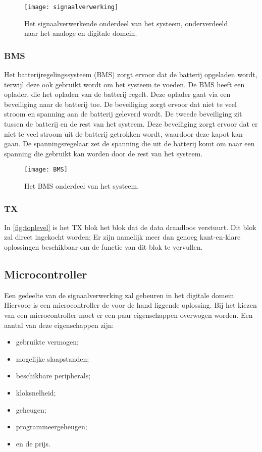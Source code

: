 \begin{figure}[ht]
    \centering
    \texttt{[image: signaalverwerking]}
    \caption{Het signaalverwerkende onderdeel van het systeem, onderverdeeld naar het analoge en digitale domein.}
    \label{fig:signaalverwerking}
\end{figure}

\subsubsection{BMS}
Het batterijregelingssysteem (BMS) zorgt ervoor dat de batterij opgeladen wordt, terwijl deze ook gebruikt wordt om het systeem te voeden.
De BMS heeft een oplader, die het opladen van de batterij regelt. Deze oplader gaat via een beveiliging naar de batterij toe. De beveiliging zorgt ervoor dat niet te veel stroom en spanning aan de batterij geleverd wordt. De tweede beveiliging zit tussen de batterij en de rest van het systeem. Deze beveiliging zorgt ervoor dat er niet te veel stroom uit de batterij getrokken wordt, waardoor deze kapot kan gaan. De spanningsregelaar zet de spanning die uit de batterij komt om naar een spanning die gebruikt kan worden door de rest van het systeem. 

\begin{figure}[ht]
    \centering
    \texttt{[image: BMS]}
    \caption{Het BMS onderdeel van het systeem.}
    \label{fig:BMS}
\end{figure}

\subsubsection{TX}
In \autoref{fig:toplevel} is het TX blok het blok dat de data draadloos verstuurt. Dit blok zal direct ingekocht worden; Er zijn namelijk meer dan genoeg kant-en-klare oplossingen beschikbaar om de functie van dit blok te vervullen.


\subsection{Microcontroller}
Een gedeelte van de signaalverwerking zal gebeuren in het digitale domein. Hiervoor is een microcontroller de voor de hand liggende oplossing. Bij het kiezen van een microcontroller moet er een paar eigenschappen overwogen worden. Een aantal van deze eigenschappen zijn:
\begin{itemize}
    \item gebruikte vermogen;
    \item mogelijke slaapstanden;
    \item beschikbare peripherals;
    \item kloksnelheid;
    \item geheugen;
    \item programmeergeheugen;
    \item en de prijs.
\end{itemize}



\begin{figure}
    \centering
    \def\svgwidth{0.5\textwidth}
    
\end{figure}
